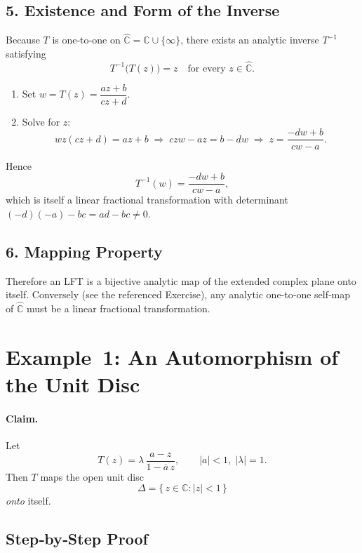 \documentclass[12pt]{article}
\theoremstyle{definition} %
\theoremstyle{plain} %
\begin{document}
\subsection*{5. Existence and Form of the Inverse}
Because $T$ is one‑to‑one on $\widehat{\mathbb C}=\mathbb C\cup\{\infty\}$,
there exists an analytic inverse $T^{-1}$ satisfying
\[
   T^{-1}\!\bigl(T(z)\bigr)=z
   \quad\text{for every }z\in\widehat{\mathbb C}.
\]
\begin{enumerate}
  \item Set $w=T(z)=\dfrac{az+b}{cz+d}$.
  \item Solve for $z$:
        \[
          wz(cz+d)=az+b
          \;\Longrightarrow\;
          czw-az=b-dw
          \;\Longrightarrow\;
          z=\frac{-dw+b}{cw-a}.
        \]
\end{enumerate}
Hence
\[
   T^{-1}(w)=\frac{-dw+b}{cw-a},
\]
which is itself a linear fractional transformation with determinant
$(-d)(-a)-bc=ad-bc\neq0$.

\subsection*{6. Mapping Property}
Therefore an LFT is a bijective analytic map of the extended complex plane
onto itself.  Conversely (see the referenced Exercise), any analytic
one‑to‑one self‑map of $\widehat{\mathbb C}$ must be a linear fractional
transformation.

\section*{Example 1:  An Automorphism of the Unit Disc}

\paragraph{Claim.}
Let
\[
   T(z)=\lambda\,\frac{a-z}{1-\overline{a}\,z},
   \qquad |a|<1,\;|\lambda|=1 .
\]
Then $T$ maps the open unit disc
\[
   \Delta=\{\,z\in\mathbb C : |z|<1\,\}
\]
\emph{onto} itself.

\subsection*{Step‑by‑Step Proof}
\end{document}
